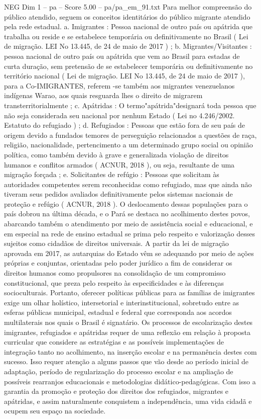 \begin{textsample}{NEG Dim 1 – pa – Score 5.00 – pa/pa\_em\_91.txt}  \label{ex:f1_neg_255}
Para melhor compreensão do público atendido, seguem os conceitos identitários do público migrante atendido pela rede estadual. a.
Imigrantes : Pessoa nacional de outro país ou apátrida que trabalha ou reside e se estabelece temporária ou definitivamente no Brasil ( Lei de migração.
LEI No 13.445, de 24 de maio de 2017 ) ; b.
Migrantes/Visitantes : pessoa nacional de outro país ou apátrida que vem ao Brasil para estadas de curta duração, sem pretensão de se estabelecer temporária ou definitivamente no território nacional ( Lei de migração.
LEI No 13.445, de 24 de maio de 2017 ), para a Co-IMIGRANTES, referem -se também aos migrantes venezuelanos indígenas Warao, aos quais resguarda lhes o direito de migrarem transterritorialmente ; c.
Apátridas : O termo"apátrida"designará toda pessoa que não seja considerada seu nacional por nenhum Estado ( Lei no 4.246/2002.
Estatuto do refugiado ) ; d.
Refugiados : Pessoas que estão fora de seu país de origem devido a fundados temores de perseguição relacionados a questões de raça, religião, nacionalidade, pertencimento a um determinado grupo social ou opinião política, como também devido à grave e generalizada violação de direitos humanos e conflitos armados ( ACNUR, 2018 ), ou seja, resultante de uma migração forçada ; e.
Solicitantes de refúgio : Pessoas que solicitam às autoridades competentes serem reconhecidas como refugiado, mas que ainda não tiveram seus pedidos avaliados definitivamente pelos sistemas nacionais de proteção e refúgio ( ACNUR, 2018 ).
O deslocamento dessas populações para o país dobrou na última década, e o Pará se destaca no acolhimento destes povos, abarcando também o atendimento por meio de assistência social e educacional, e em especial na rede de ensino estadual se prima pelo respeito e valorização desses sujeitos como cidadãos de direitos universais.
A partir da lei de migração aprovada em 2017, as autarquias do Estado vêm se adequando por meio de ações próprias e conjuntas, orientadas pelo poder jurídico a fim de considerar os direitos humanos como propulsores na consolidação de um compromisso constitucional, que preza pelo respeito às especificidades e às diferenças socioculturais.
Portanto, oferecer políticas públicas para as famílias de imigrantes exige um olhar holístico, intersetorial e interinstitucional, sobretudo entre as esferas públicas municipal, estadual e federal que corresponda aos acordos multilaterais nos quais o Brasil é signatário.
Os processos de escolarização destes imigrantes, refugiados e apátridas requer de uma reflexão em relação à proposta curricular que considere as estratégias e as possíveis implementações de integração tanto no acolhimento, na inserção escolar e na permanência destes com sucesso.
Isso requer atenção a alguns passos que vão desde ao período inicial de adaptação, período de regularização do processo escolar e na ampliação de possíveis rearranjos educacionais e metodologias didático-pedagógicas.
Com isso a garantia da promoção e proteção dos direitos dos refugiados, migrantes e apátridas, e assim naturalmente conquistem a independência, uma vida cidadã e ocupem seu espaço na sociedade.

\end{textsample}
